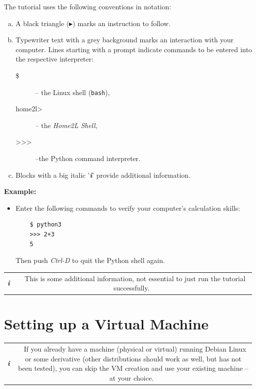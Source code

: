 \documentclass[12pt,english,parskip=half]{scrreprt}
\newcommand{\lst}[1]{\colorbox{lstbackground}{\ttfamily\footnotesize#1}}
\newcommand{\infobox}[1]{
  \hfill
  \setlength\arrayrulewidth{1pt}
  \begin{tabular}[t]{c|c|}
    \parbox{1.8em}{\hfill\textit{\Huge\textbf{i}\,}}
    &
    \,\parbox{0.89\linewidth}{\setlength{\parskip}{0.5em}#1}\,
  \end{tabular}
  \par
}
\begin{document}
The tutorial uses the following conventions in notation:

\begin{enumerate}[a)]
  \item A black triangle ($\blacktriangleright$) marks an instruction to follow.
  \item \lst{Typewriter text with a grey background} marks an interaction with your computer.
    Lines starting with a prompt indicate commands to be entered into the respective
    interpreter:
    \begin{description}
      \item[\lst{\$}] -- the Linux shell (\texttt{bash}),
      \item[\lst{home2l\textgreater}] -- the \emph{Home2L Shell},
      \item[\lst{\textgreater\textgreater\textgreater}] --the Python command interpreter.
    \end{description}
  \item Blocks with a big italic '\textbf{\textit{i}}' provide additional information.
\end{enumerate}

\textbf{Example:}

\begin{itemize}[$\blacktriangleright$]
  \item Enter the following commands to verify your computer's calculation skills:
    \begin{lstlisting}
    $ python3
    >>> 2+3
    5
    \end{lstlisting}
    Then push \emph{Ctrl-D} to quit the Python shell again.
\end{itemize}

\infobox{
  This is some additional information, not essential to just run the tutorial successfully.
}





\section{Setting up a Virtual Machine}
\label{sec:tutorial-vm}


\infobox{
  If you already have a machine (physical or virtual) running Debian Linux 
  or some derivative (other distributions should work as well, but has not been tested), 
  you can skip the VM creation and use your existing machine -- at your choice.
}
\end{document}
